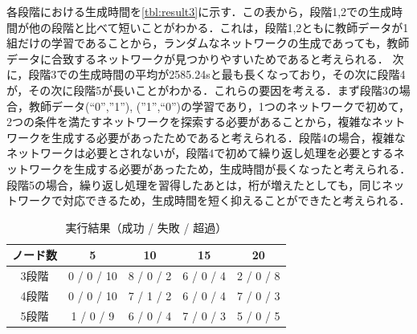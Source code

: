 \documentclass[exploratorypaper]{jsaiart} %
\begin{document}
各段階における生成時間を\ref{tbl:result3}に示す．この表から，段階1,2での生成時間が他の段階と比べて短いことがわかる．これは，段階1,2ともに教師データが1組だけの学習であることから，ランダムなネットワークの生成であっても，教師データに合致するネットワークが見つかりやすいためであると考えられる．
次に，段階3での生成時間の平均が2585.24sと最も長くなっており，その次に段階4が，その次に段階5が長いことがわかる．これらの要因を考える．まず段階3の場合，教師データ(“0”,”1”), (”1”,“0”)の学習であり，1つのネットワークで初めて，2つの条件を満たすネットワークを探索する必要があることから，複雑なネットワークを生成する必要があったためであると考えられる．段階4の場合，複雑なネットワークは必要とされないが，段階4で初めて繰り返し処理を必要とするネットワークを生成する必要があったため，生成時間が長くなったと考えられる．段階5の場合，繰り返し処理を習得したあとは，桁が増えたとしても，同じネットワークで対応できるため，生成時間を短く抑えることができたと考えられる．


\begin{table}[htbp]
\caption{実行結果（成功 / 失敗 / 超過）}
\label{tbl:result1}
\begin{tabular}{c|cccc}
    ノード数&	5&	10&	15&	20\\
    \hline \hline
    3段階&	0 / 0 / 10&	8 / 0 / 2&	6 / 0 / 4&	2 / 0 / 8\\
    4段階&	0 / 0 / 10&	7 / 1 / 2&	6 / 0 / 4&	7 / 0 / 3\\
    5段階&	1 / 0 / 9&	6 / 0 / 4&	7 / 0 / 3&	5 / 0 / 5\\
    \hline
\end{tabular}
\end{table}
\end{document}
